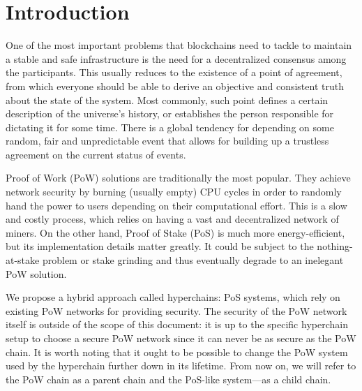 \section{Introduction}

One of the most important problems that blockchains need to tackle to maintain a
stable and safe infrastructure is the need for a decentralized consensus among
the participants. This usually reduces to the existence of a point of agreement,
from which everyone should be able to derive an objective and consistent truth
about the state of the system. Most commonly, such point defines a certain
description of the universe's history, or establishes the person responsible for
dictating it for some time. There is a global tendency for depending on some
random, fair and unpredictable event that allows for building up a trustless
agreement on the current status of events.

Proof of Work (PoW) solutions are traditionally the most popular. They achieve
network security by burning (usually empty) CPU cycles in order to randomly hand
the power to users depending on their computational effort. This is a slow and
costly process, which relies on having a vast and decentralized network of
miners. On the other hand, Proof of Stake (PoS) is much more energy-efficient,
but its implementation details matter greatly. It could be subject to the
nothing-at-stake problem or stake grinding and thus eventually degrade to an
inelegant PoW solution.

We propose a hybrid approach called hyperchains: PoS systems, which rely on
existing PoW networks for providing security. The security of the PoW network
itself is outside of the scope of this document: it is up to the specific
hyperchain setup to choose a secure PoW network since it can never be as secure
as the PoW chain. It is worth noting that it ought to be possible to change the
PoW system used by the hyperchain further down in its lifetime. From now on, we
will refer to the PoW chain as a parent chain and the PoS-like system---as a
child chain.
